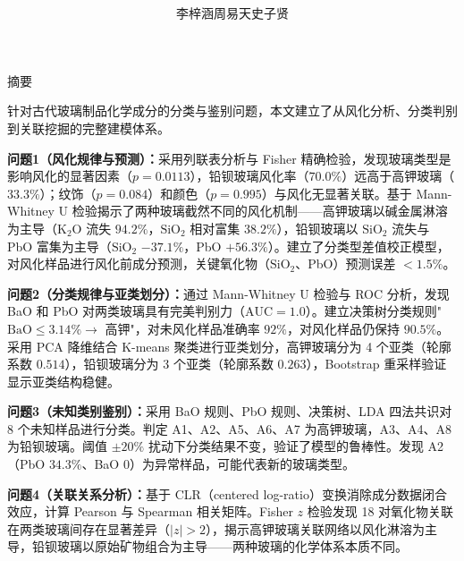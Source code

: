 \documentclass[a4paper,12pt]{ctexart}
\begin{document}
\title{
    \textbf{}
}
\author{李梓涵\quad 周易天\quad 史子贤}
\date{}

\maketitle

\thispagestyle{empty}

\begin{center}
    \heiti 摘\quad 要
\end{center}

针对古代玻璃制品化学成分的分类与鉴别问题，本文建立了从风化分析、分类判别到关联挖掘的完整建模体系。

\textbf{问题1（风化规律与预测）：}采用列联表分析与 Fisher 精确检验，发现玻璃类型是影响风化的显著因素（$p = 0.0113$），铅钡玻璃风化率（$70.0\%$）远高于高钾玻璃（$33.3\%$）；纹饰（$p = 0.084$）和颜色（$p = 0.995$）与风化无显著关联。基于 Mann-Whitney U 检验揭示了两种玻璃截然不同的风化机制——高钾玻璃以碱金属淋溶为主导（$\text{K}_2\text{O}$ 流失 $94.2\%$，$\text{SiO}_2$ 相对富集 $38.2\%$），铅钡玻璃以 $\text{SiO}_2$ 流失与 PbO 富集为主导（$\text{SiO}_2$ $-37.1\%$，PbO $+56.3\%$）。建立了分类型差值校正模型，对风化样品进行风化前成分预测，关键氧化物（$\text{SiO}_2$、PbO）预测误差 $< 1.5\%$。

\textbf{问题2（分类规律与亚类划分）：}通过 Mann-Whitney U 检验与 ROC 分析，发现 BaO 和 PbO 对两类玻璃具有完美判别力（$\text{AUC} = 1.0$）。建立决策树分类规则"$\text{BaO} \leq 3.14\% \rightarrow$ 高钾"，对未风化样品准确率 $92\%$，对风化样品仍保持 $90.5\%$。采用 PCA 降维结合 K-means 聚类进行亚类划分，高钾玻璃分为 4 个亚类（轮廓系数 $0.514$），铅钡玻璃分为 3 个亚类（轮廓系数 $0.263$），Bootstrap 重采样验证显示亚类结构稳健。

\textbf{问题3（未知类别鉴别）：}采用 BaO 规则、PbO 规则、决策树、LDA 四法共识对 8 个未知样品进行分类。判定 A1、A2、A5、A6、A7 为高钾玻璃，A3、A4、A8 为铅钡玻璃。阈值 $\pm 20\%$ 扰动下分类结果不变，验证了模型的鲁棒性。发现 A2（PbO $34.3\%$、BaO $0$）为异常样品，可能代表新的玻璃类型。

\textbf{问题4（关联关系分析）：}基于 CLR（centered log-ratio）变换消除成分数据闭合效应，计算 Pearson 与 Spearman 相关矩阵。Fisher $z$ 检验发现 18 对氧化物关联在两类玻璃间存在显著差异（$|z| > 2$），揭示高钾玻璃关联网络以风化淋溶为主导，铅钡玻璃以原始矿物组合为主导——两种玻璃的化学体系本质不同。
\end{document}
